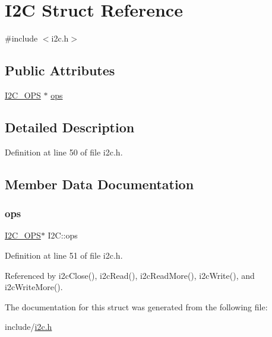 \hypertarget{structI2C}{}\section{I2C Struct Reference}
\label{structI2C}


{\ttfamily \#include $<$i2c.\+h$>$}

\subsection*{Public Attributes}
\begin{DoxyCompactItemize}
\item 
\mbox{\hyperlink{structI2C__OPS}{I2\+C\+\_\+\+O\+PS}} $\ast$ \mbox{\hyperlink{structI2C_aa7bf72993674d0a13958b93b3dc6c89a}{ops}}
\end{DoxyCompactItemize}


\subsection{Detailed Description}


Definition at line 50 of file i2c.\+h.



\subsection{Member Data Documentation}
\mbox{\label{structI2C_aa7bf72993674d0a13958b93b3dc6c89a}} 
\subsubsection{\texorpdfstring{ops}{ops}}
{\footnotesize\ttfamily \mbox{\hyperlink{structI2C__OPS}{I2\+C\+\_\+\+O\+PS}}$\ast$ I2\+C\+::ops}



Definition at line 51 of file i2c.\+h.



Referenced by i2c\+Close(), i2c\+Read(), i2c\+Read\+More(), i2c\+Write(), and i2c\+Write\+More().



The documentation for this struct was generated from the following file\+:\begin{DoxyCompactItemize}
\item 
include/\mbox{\hyperlink{i2c_8h}{i2c.\+h}}\end{DoxyCompactItemize}
